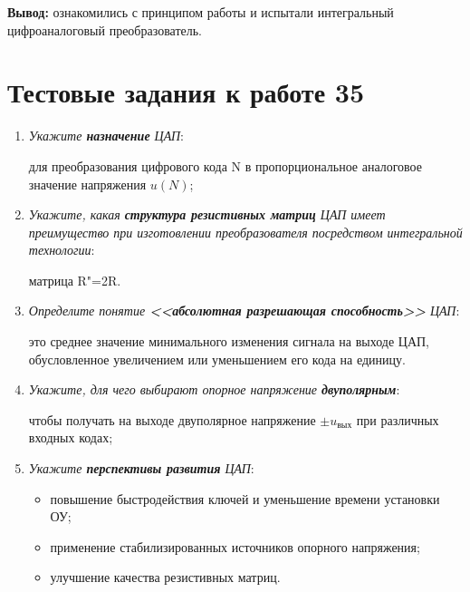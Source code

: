 \documentclass[spec, och, labwork]{shiza}
\begin{document}
\textbf{Вывод:} ознакомились с принципом работы и испытали интегральный
цифроаналоговый преобразователь.


\section*{Тестовые задания к работе 35}

\begin{enumerate}
    \item 
        \textit{Укажите \textbf{назначение} ЦАП}:

        для преобразования цифрового кода N в пропорциональное аналоговое
        значение напряжения $u(N)$;

    \item
        \textit{Укажите, какая \textbf{структура резистивных матриц} ЦАП имеет
        преимущество при изготовлении преобразователя посредством интегральной
        технологии}:

        матрица R"=2R.

    \item
        \textit{Определите понятие \textbf{<<абсолютная разрешающая
        способность>>} ЦАП}:

        это среднее значение минимального изменения сигнала на выходе ЦАП,
        обусловленное увеличением или уменьшением его кода на единицу.

    \item
        \textit{Укажите, для чего выбирают опорное напряжение
        \textbf{двуполярным}}:

        чтобы получать на выходе двуполярное напряжение $\pm u_\text{вых}$ при
        различных входных кодах;

    \item
        \textit{Укажите \textbf{перспективы развития} ЦАП}:

        \begin{itemize}
            \item повышение быстродействия ключей и уменьшение времени установки ОУ;
            \item применение стабилизированных источников опорного напряжения;
            \item улучшение качества резистивных матриц.
        \end{itemize}
\end{enumerate}
\end{document}
